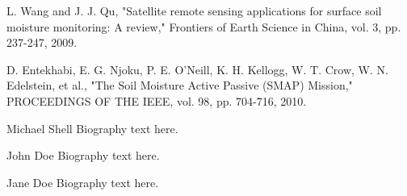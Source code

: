 \documentclass[draftcls]{IEEEtran}
\begin{document}
\begin{thebibliography}{1}
L. Wang and J. J. Qu, "Satellite remote sensing applications for surface soil moisture monitoring: A review," Frontiers of Earth Science in China, vol. 3, pp. 237-247, 2009.

D. Entekhabi, E. G. Njoku, P. E. O'Neill, K. H. Kellogg, W. T. Crow, W. N. Edelstein, et al., "The Soil Moisture Active Passive (SMAP) Mission," PROCEEDINGS OF THE IEEE, vol. 98, pp. 704-716, 2010.

\end{thebibliography}

% 

\begin{IEEEbiography}{Michael Shell}
Biography text here.
\end{IEEEbiography}

\begin{IEEEbiographynophoto}{John Doe}
Biography text here.
\end{IEEEbiographynophoto}


\begin{IEEEbiographynophoto}{Jane Doe}
Biography text here.
\end{IEEEbiographynophoto}






\end{document}
